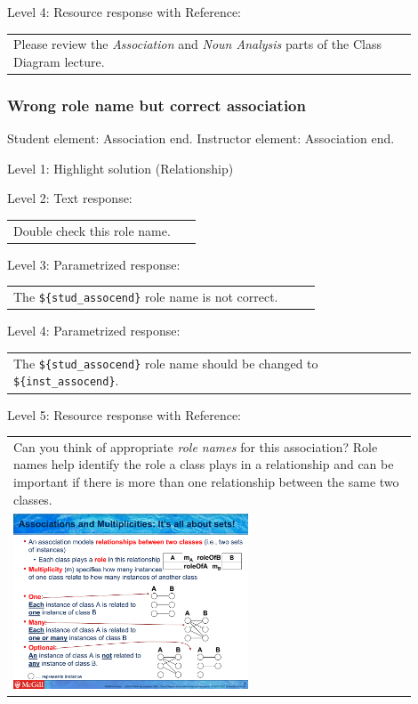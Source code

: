 \noindent Level 4: Resource response with Reference: \medskip

\begin{tabular}{|p{0.9\linewidth}}
Please review the \textit{Association} and \textit{Noun Analysis} parts of the Class Diagram lecture.
\end{tabular} \medskip


\subsubsection{Wrong role name but correct association}

Student element: Association end. Instructor element: Association end. \medskip

\noindent Level 1: Highlight solution (Relationship) \medskip

\noindent Level 2: Text response: \medskip

\begin{tabular}{|p{0.9\linewidth}}
Double check this role name.
\end{tabular} \medskip

\noindent Level 3: Parametrized response: \medskip

\begin{tabular}{|p{0.9\linewidth}}
The \verb|${stud_assocend}| role name is not correct.
\end{tabular} \medskip

\noindent Level 4: Parametrized response: \medskip

\begin{tabular}{|p{0.9\linewidth}}
The \verb|${stud_assocend}| role name should be changed to \verb|${inst_assocend}|.
\end{tabular} \medskip

\noindent Level 5: Resource response with Reference: \medskip

\begin{tabular}{|p{0.9\linewidth}}
Can you think of appropriate \textit{role names}
for this association? Role names help identify the role a class plays in a
relationship and can be important if there is more than one relationship
between the same two classes.

\\
\includegraphics[width=0.6\textwidth]{images/role_name.png}

\end{tabular} \medskip


